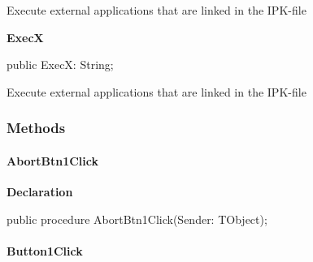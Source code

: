 \documentclass{report}
\newif\ifpdf
\begin{document}
\begin{list}{}
\begin{flushleft}
\ifpdf
\end{flushleft}
\fi


\par Execute external applications that are linked in the IPK{-}file\label{mainunit.TIWizFrm-ExecX}
\item[\textbf{ExecX}\hfill]
\ifpdf
\begin{flushleft}
\fi
\begin{ttfamily}
public ExecX: String;\end{ttfamily}

\ifpdf
\end{flushleft}
\fi


\par Execute external applications that are linked in the IPK{-}file\end{list}
\subsubsection*{\large{\textbf{Methods}}\normalsize\hspace{1ex}\hfill}
\paragraph*{AbortBtn1Click}\hspace*{\fill}

\label{mainunit.TIWizFrm-AbortBtn1Click}
\begin{list}{}{
\setlength{\itemindent}{0cm}
\setlength{\listparindent}{0cm}
\setlength{\leftmargin}{\evensidemargin}
\addtolength{\leftmargin}{\tmplength}
\settowidth{\labelsep}{X}
\addtolength{\leftmargin}{\labelsep}
\setlength{\labelwidth}{\tmplength}
}
\item[\textbf{Declaration}\hfill]
\ifpdf
\begin{flushleft}
\fi
\begin{ttfamily}
public procedure AbortBtn1Click(Sender: TObject);\end{ttfamily}

\ifpdf
\end{flushleft}
\fi

\end{list}
\paragraph*{Button1Click}\hspace*{\fill}
\end{document}
